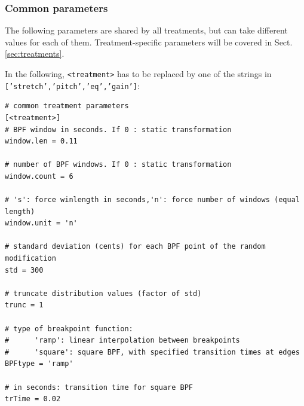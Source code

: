 \documentclass[oneside,10pt]{article}
\newcommand{\mic}{\texttt}
\begin{document}
\subsubsection{Common parameters}

The following parameters are shared by all treatments, but can take different values for each of them. Treatment-specific parameters will be covered in Sect. \ref{sec:treatments}.

In the following, \texttt{<treatment>} has to be replaced by one of the strings in \mic{['stretch','pitch','eq','gain']}:

\vspace{5pt}
\begin{verbatim}
# common treatment parameters
[<treatment>]
# BPF window in seconds. If 0 : static transformation
window.len = 0.11

# number of BPF windows. If 0 : static transformation
window.count = 6

# 's': force winlength in seconds,'n': force number of windows (equal length)
window.unit = 'n'

# standard deviation (cents) for each BPF point of the random modification
std = 300

# truncate distribution values (factor of std)
trunc = 1

# type of breakpoint function:
#      'ramp': linear interpolation between breakpoints
#      'square': square BPF, with specified transition times at edges
BPFtype = 'ramp'

# in seconds: transition time for square BPF
trTime = 0.02
\end{verbatim}
\end{document}
